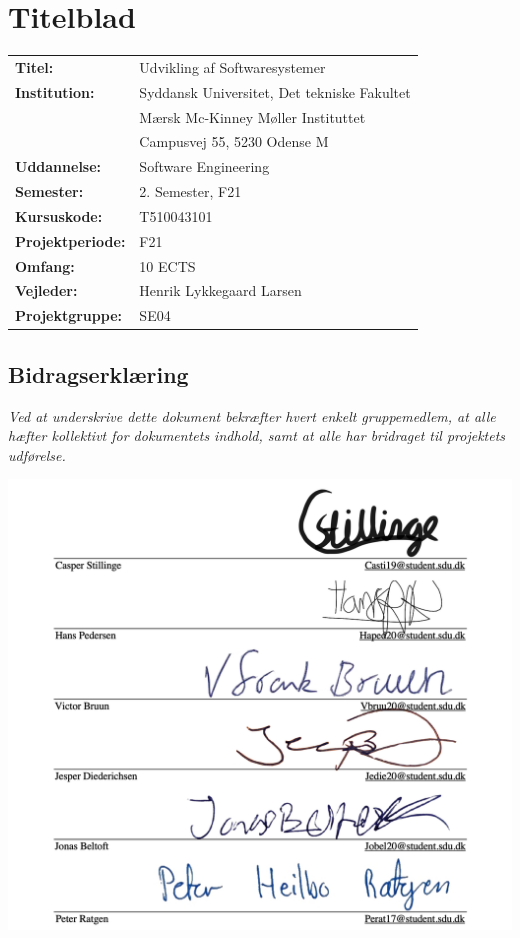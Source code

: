 \section{Titelblad}
\begin{table}[h!]
    \centering
    \begin{tabular}{ll}
        \textbf{Titel:} & Udvikling af Softwaresystemer \\
        \textbf{Institution:} & Syddansk Universitet, Det tekniske Fakultet\\
        & Mærsk Mc-Kinney Møller Instituttet\\
        & Campusvej 55, 5230 Odense M\\
        \textbf{Uddannelse:} & Software Engineering\\
        \textbf{Semester:} & 2. Semester, F21\\
        \textbf{Kursuskode:} & T510043101\\
        \textbf{Projektperiode:} & F21\\
        \textbf{Omfang:} & 10 ECTS\\
        \textbf{Vejleder:} & Henrik Lykkegaard Larsen\\
        \textbf{Projektgruppe:} & SE04\\
    \end{tabular}
\end{table}

\subsection{Bidragserklæring}
\textit{Ved at underskrive dette dokument bekræfter hvert enkelt gruppemedlem, at alle hæfter kollektivt for dokumentets indhold, samt at alle har bridraget til projektets udførelse.}

\includegraphics[scale=0.5]{images/underskrift.png}

